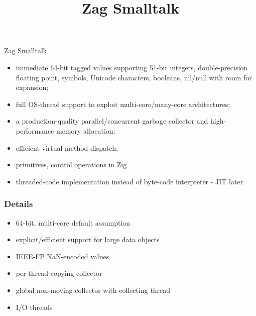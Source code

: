 \documentclass{beamer}
\title[Zag]{Zag Smalltalk}
\begin{document}
\begin{frame}
  \titlepage
\end{frame}


\begin{frame}{Zag Smalltalk}{}
  \begin{itemize}
  \item immediate 64-bit tagged values supporting 51-bit integers, double-precision floating point, symbols, Unicode characters, booleans, nil/null with room for expansion;
  \item full OS-thread support to exploit multi-core/many-core architectures;
  \item a production-quality parallel/concurrent garbage collector and high-performance memory allocation;
  \item efficient virtual method dispatch;
  \item primitives, control operations in Zig
  \item threaded-code implementation instead of byte-code interpreter - JIT later
  \end{itemize}
\end{frame}


\begin{frame}
  \frametitle{Details}
  \begin{itemize}
  \item 64-bit, multi-core default assumption
  \item explicit/efficient support for large data objects
  \item IEEE-FP NaN-encoded values
  \item per-thread copying collector
  \item global non-moving collector with collecting thread
  \item I/O threads
  \end{itemize}
\end{frame}
\end{document}
